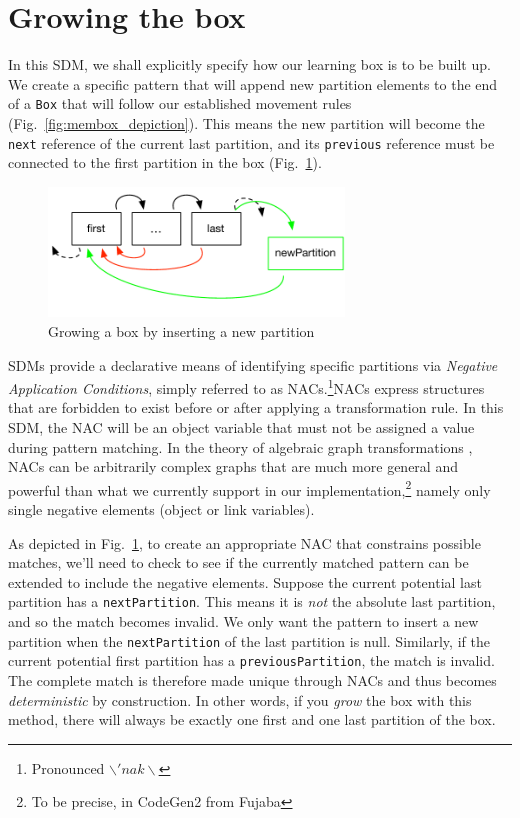 \newpage
\section{Growing the box}
\genHeader

In this SDM, we shall explicitly specify how our learning box is to be built up. We create a specific pattern that will append new partition elements to the end
of a \texttt{Box} that will follow our established movement rules (Fig.~\ref{fig:membox_depiction}). This means the new partition will become the \texttt{next}
reference of the current last partition, and its \texttt{previous} reference must be connected to the first partition in the box (Fig.~\ref{fig:goal_grow}).

\begin{figure}[htbp]
 	\centering
  	\includegraphics[width=0.7\textwidth]{growBoxNACGoal.pdf}
	\caption{Growing a box by inserting a new partition \update}
	\label{fig:goal_grow}
\end{figure}
\FloatBarrier

SDMs provide a declarative means of identifying specific partitions via \emph{Negative Application Conditions}, simply referred to as
\mbox{NAC}s.\footnote{Pronounced $\backslash 'nak \backslash$}\mbox{NAC}s express structures that are forbidden to exist before or after applying a
transformation rule. In this SDM, the \mbox{NAC} will be an object variable that must not be assigned a value during pattern matching. In the theory of
algebraic graph transformations \cite{EEPT06}, \mbox{NACs} can be arbitrarily complex graphs that are much more general and powerful than what we currently
support in our implementation,\footnote{To be precise, in CodeGen2 from Fujaba} namely only single negative elements (object or link variables).

As depicted in Fig.~\ref{fig:goal_grow}, to create an appropriate \mbox{NAC} that constrains possible matches, we'll need to check to see if the currently
matched pattern can be extended to include the negative elements. Suppose the current potential last partition has a \texttt{nextPartition}. This means it
is \emph{not} the absolute last partition, and so the match becomes invalid. We only want the pattern to insert a new partition when the \texttt{nextPartition}
of the last partition is null. Similarly, if the current potential first partition has a \texttt{previousPartition}, the match is invalid. The complete match is
therefore made unique through NACs and thus becomes \emph{deterministic} by construction. In other words, if you \emph{grow} the box with this method, there
will always be exactly one first and one last partition of the box.


